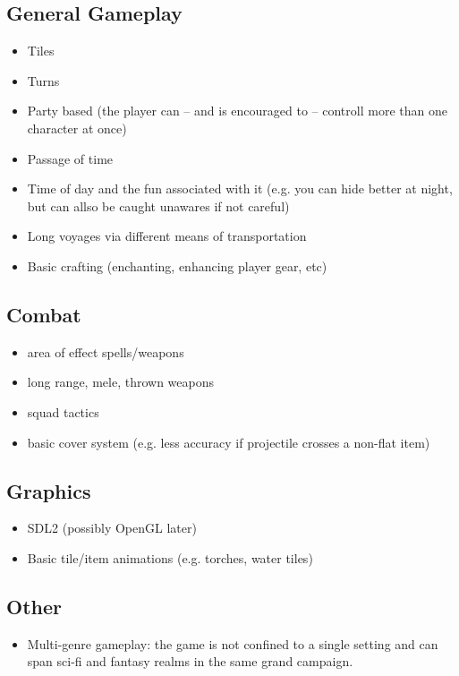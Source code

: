 \documentclass[a4paper,10pt]{book}
\begin{document}
\subsection{General Gameplay}
\begin{itemize}
  \item Tiles
  \item Turns
  \item Party based (the player can -- and is encouraged to -- controll more than one character at once)
  \item Passage of time
  \item Time of day and the fun associated with it (e.g. you can hide better at night, but can allso be caught
    unawares if not careful)
  \item Long voyages via different means of transportation
  \item Basic crafting (enchanting, enhancing player gear, etc)
\end{itemize}

\subsection{Combat}
\begin{itemize}
  \item area of effect spells/weapons
  \item long range, mele, thrown weapons
  \item squad tactics
  \item basic cover system (e.g. less accuracy if projectile crosses a non-flat item)
\end{itemize}

\subsection{Graphics}
\begin{itemize}
  \item SDL2 (possibly OpenGL later)
  \item Basic tile/item animations (e.g. torches, water tiles)
\end{itemize}

\subsection{Other}
\begin{itemize}
  \item Multi-genre gameplay: the game is not confined to a single setting and can span sci-fi and fantasy realms in the same grand campaign.
\end{itemize}
\end{document}

